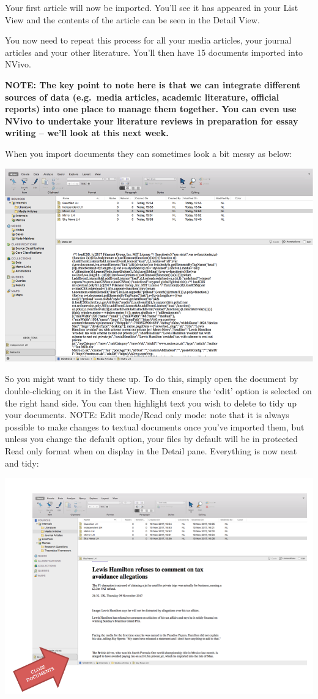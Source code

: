 \documentclass[]{book}
\theoremstyle{definition}
\theoremstyle{definition}
\theoremstyle{definition}
\theoremstyle{remark}
\begin{document}
Your first article will now be imported. You'll see it has appeared in
your List View and the contents of the article can be seen in the Detail
View.

You now need to repeat this process for all your media articles, your
journal articles and your other literature. You'll then have 15
documents imported into NVivo.

\textbf{NOTE: The key point to note here is that we can integrate
different sources of data (e.g.~media articles, academic literature,
official reports) into one place to manage them together. You can even
use NVivo to undertake your literature reviews in preparation for essay
writing -- we'll look at this next week.}

When you import documents they can sometimes look a bit messy as below:

\includegraphics{imgs/qual_16.png}

So you might want to tidy these up. To do this, simply open the document
by double-clicking on it in the List View. Then ensure the `edit' option
is selected on the right hand side. You can then highlight text you wish
to delete to tidy up your documents. NOTE: Edit mode/Read only mode:
note that it is always possible to make changes to textual documents
once you've imported them, but unless you change the default option,
your files by default will be in protected Read only format when on
display in the Detail pane. Everything is now neat and tidy:

\includegraphics{imgs/qual_17.png}
\end{document}
